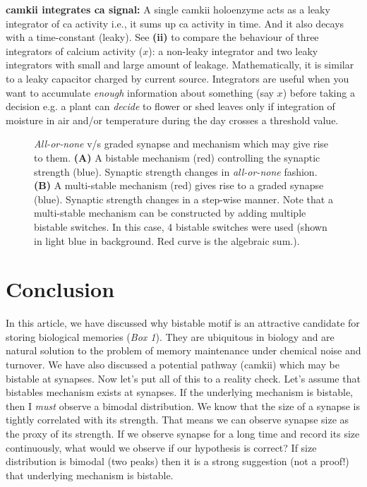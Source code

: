 \documentclass[]{resonance}
\begin{document}
{    \textbf{\gls{camkii} integrates \gls{ca} signal:} A single \gls{camkii}
    holoenzyme acts as a leaky integrator of \gls{ca} activity i.e., it sums up
    \gls{ca} activity in time. And it also decays with a time-constant (leaky).
    See \textbf{(ii)} to compare the behaviour of three integrators of calcium
    activity ($x$): a non-leaky integrator and two leaky integrators with small
    and large amount of leakage. Mathematically, it is similar to a leaky
    capacitor charged by current source. Integrators are useful when you want to
    accumulate \emph{enough} information about something (say $x$) before taking
    a decision e.g.  a plant can \emph{decide} to flower or shed leaves only if
    integration of moisture in air and/or temperature during the day crosses a
    threshold value.

} %

\begin{figure}[h!]
    \centering
    \caption{\textit{All-or-none} v/s graded synapse and mechanism which may
        give rise to them. \textbf{(A)} A bistable mechanism (red) controlling the 
        synaptic strength (blue). Synaptic strength changes in \textit{all-or-none}
        fashion. \textbf{(B)} A multi-stable mechanism (red) gives rise to a
        graded synapse (blue). Synaptic strength changes in a step-wise manner. Note that 
        a multi-stable mechanism can be constructed by adding multiple bistable
        switches. In this case, 4 bistable switches were used (shown in light
        blue in background. Red curve is the algebraic sum.).
    }
    \label{fig:fig_bistable_multistable}
    \vspace{2mm}
\end{figure}


\section{Conclusion} 

In this article, we have discussed why bistable motif is an attractive candidate
for storing biological memories (\textit{Box 1}). They are ubiquitous in biology
and are natural solution to the problem of memory maintenance under chemical
noise and turnover.  We have also discussed a potential pathway (\gls{camkii})
which may be bistable at synapses. Now let's put all of this to a reality check.
Let's assume that bistables mechanism exists at synapses. If the underlying
mechanism is bistable, then I \emph{must} observe a bimodal distribution. We
know that the size of a synapse is tightly correlated with its strength. That
means we can observe synapse size as the proxy of its strength.  If we observe
synapse for a long time and record its size continuously, what would we observe
if our hypothesis is correct? If size distribution is bimodal (two peaks) then
it is a strong suggestion (not a proof!) that underlying mechanism is bistable. 
\end{document}
